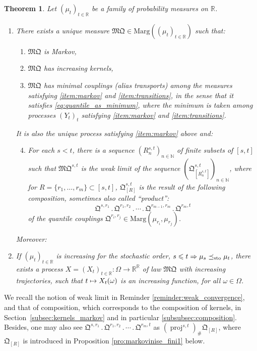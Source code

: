 \documentclass[JEP,XML,SOM,Unicode,NoEqCountersInSection,NoFloatCountersInSection,published]{cedram}
\newcommand{\ldot}{\mathbin{.}}
\newcommand{\lcdots}{\ldot\cdots\ldot}
\newcommand\mto{\mathchoice{\longmapsto}{\mapsto}{\mapsto}{\mapsto}}
\theoremstyle{plain}
\newtheorem{themBJ}{Theorem}
\theoremstyle{definition}
\newcommand{\como}{\mathfrak{Q}}
\newcommand{\mq}{\mathfrak{MQ}}
\newcommand{\ma}{\mathrm{Marg}}
\newcommand{\R}{\mathbb{R}}
\newcommand{\N}{\mathbb{N}}
\newcommand{\leqs}{\preceq_{\text{\rm sto}}}
\newcommand{\pr}{\operatorname{proj}}
\begin{document}
\begin{themBJ}\label{them:a}
Let $(\mu_t)_{t\in\R}$ be a family of probability measures on $\R$.\begin{enumerate}
\item
\label{p1:them:a} There exists a unique measure $\mq\in \ma((\mu_t)_{t\in \R})$ such that:
\begin{enumerate}
\item
\label{item:markov}
$\mq$ is Markov,
\item
\label{item:transitions}
$\mq$ has increasing kernels,
\item\label{item:minimal}
$\mq$ has minimal couplings (alias transports) among the measures satisfying \eqref{item:markov} and \eqref{item:transitions}, in the sense that it satisfies \eqref{eq:quantile_as_minimum}, where the minimum is taken among processes $(Y_t)_t$ satisfying \eqref{item:markov} and \eqref{item:transitions}.
\end{enumerate}

\noindent It is also the unique process satisfying \eqref{item:markov} above and:
\begin{enumerate}
\setcounter{enumii}{3}
\item\label{item:limite_de_compose}
For each $s<t$, there is a sequence $(R^{s,t}_n)_{n\in \N}$ of finite subsets of $[s,t]$ such that $\mq^{s,t}$ is the weak limit of the sequence $(\como_{[R^{s,t}_n]}^{s,t})_{n\in \N}$, where for $R=\{r_1,\ldots,r_m\}\subset[s,t]$, $\como_{[R]}^{s,t}$
is the result of the following composition, sometimes also called ``product'':
\[\como^{s,r_1}{}\ldot\como^{r_1,r_2}\lcdots \como^{r_{m-1},r_m}{}\ldot\como^{r_{m},t}\]
of the quantile couplings $\como^{r_i,r_j}\in\ma(\mu_{r_i},\mu_{r_j})$.
\end{enumerate}

\noindent Moreover:

\item
\label{item:croissant} If $(\mu_t)_{t\in \R}$ is increasing for the stochastic order, \ie $s\leqslant t\Rightarrow\mu_s\leqs \mu_t$, there exists a process $X=(X_{t})_{t\in\R}:\Omega\to\R^\R$ of law $\mq$ with increasing trajectories, \ie such that $t\mto X_t(\omega)$ is an increasing function, for all $\omega\in\Omega$.
\end{enumerate}
\end{themBJ}

We recall the notion of weak limit in Reminder \ref{reminder:weak_convergence}, and that of composition, which corresponds to the composition of kernels, in Section~\ref{subsec:kernels_markov} and in particular \ref{subsubsec:composition}. Besides, one may also see $\como^{s,r_1}{}\ldot\como^{r_1,r_2}\lcdots \como^{r_{m},t}$ as $(\pr^{s,t})_\#\como_{[R]}$, where $\como_{[R]}$ is introduced in Proposition \ref{pro:markovinise_fini1} below.
\end{document}
